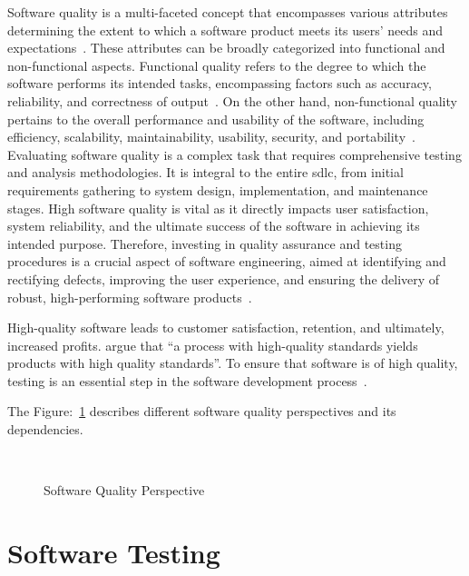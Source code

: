 Software quality is a multi-faceted concept that encompasses various attributes determining the
extent to which a software product meets its users' needs and expectations~\cite{boehm1976quantitative}.
These attributes can be broadly categorized into functional and non-functional aspects. Functional
quality refers to the degree to which the software performs its intended tasks, encompassing factors
such as accuracy, reliability, and correctness of output~\cite{kiruthika2015software}. On the other hand,
non-functional quality pertains to the overall performance and usability of the software,
including efficiency, scalability, maintainability, usability, security, and portability~\cite{chung2012non}.
Evaluating software quality is a complex task that requires comprehensive testing and analysis
methodologies. It is integral to the entire \acrlong{sdlc}, from initial
requirements gathering to system design, implementation, and maintenance stages. High software quality
is vital as it directly impacts user satisfaction, system reliability, and the ultimate success of the
software in achieving its intended purpose. Therefore, investing in quality assurance and testing
procedures is a crucial aspect of software engineering, aimed at identifying and rectifying defects,
improving the user experience, and ensuring the delivery of robust, high-performing software
products~\cite{cavano1978framework}.

High-quality software leads to customer satisfaction, retention, and ultimately, increased profits.
\citeauthor{8748529} argue that ``a process with high-quality standards yields products with high
quality standards''.
To ensure that software is of high quality, testing is an essential step in the software development
process~\cite{8748529}.

The Figure:~\ref{fig:software_quality_perspective_1} describes different software quality perspectives
and its dependencies.

\begin{figure}[H]
    \centering
    \caption{Software Quality Perspective}~\label{fig:software_quality_perspective_1}
\end{figure}



\section{Software Testing}

